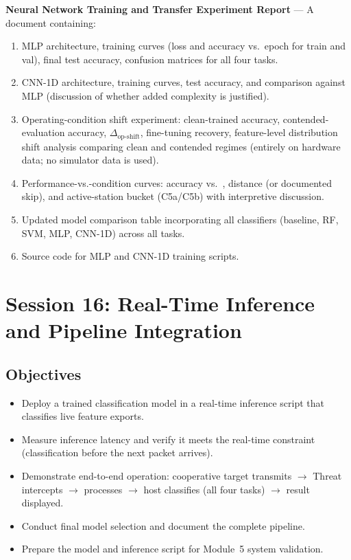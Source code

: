 \documentclass[11pt,letterpaper]{article}
\begin{document}
	\begin{tcolorbox}[deliverable={Session 15 Deliverable}]
		\textbf{Neural Network Training and Transfer Experiment Report} --- A document containing:
		\begin{enumerate}
			\item MLP architecture, training curves (loss and accuracy vs.\ epoch for train and val), final test accuracy, confusion matrices for all four tasks.
			\item CNN-1D architecture, training curves, test accuracy, and comparison against MLP (discussion of whether added complexity is justified).
			\item Operating-condition shift experiment: clean-trained accuracy, contended-evaluation accuracy, $\Delta_{\text{op-shift}}$, fine-tuning recovery, feature-level distribution shift analysis comparing clean and contended regimes (entirely on hardware data; no simulator data is used).
			\item Performance-vs.-condition curves: accuracy vs.\ \SNR{}, distance (or documented skip), and active-station bucket (C5a/C5b) with interpretive discussion.
			\item Updated model comparison table incorporating all classifiers (baseline, RF, SVM, MLP, CNN-1D) across all tasks.
			\item Source code for MLP and CNN-1D training scripts.
		\end{enumerate}
	\end{tcolorbox}

	\newpage
	\section{Session 16: Real-Time Inference and Pipeline Integration}
	\label{sec:realtime}

	\subsection{Objectives}

	\begin{itemize}[leftmargin=2em]
		\item Deploy a trained classification model in a real-time inference script that classifies live \FPGA{} feature exports.
		\item Measure inference latency and verify it meets the real-time constraint (classification before the next packet arrives).
		\item Demonstrate end-to-end operation: cooperative target transmits $\rightarrow$ Threat intercepts $\rightarrow$ \FPGA{} processes $\rightarrow$ host classifies (all four tasks) $\rightarrow$ result displayed.
		\item Conduct final model selection and document the complete \ML{} pipeline.
		\item Prepare the model and inference script for Module~5 system validation.
	\end{itemize}
\end{document}
